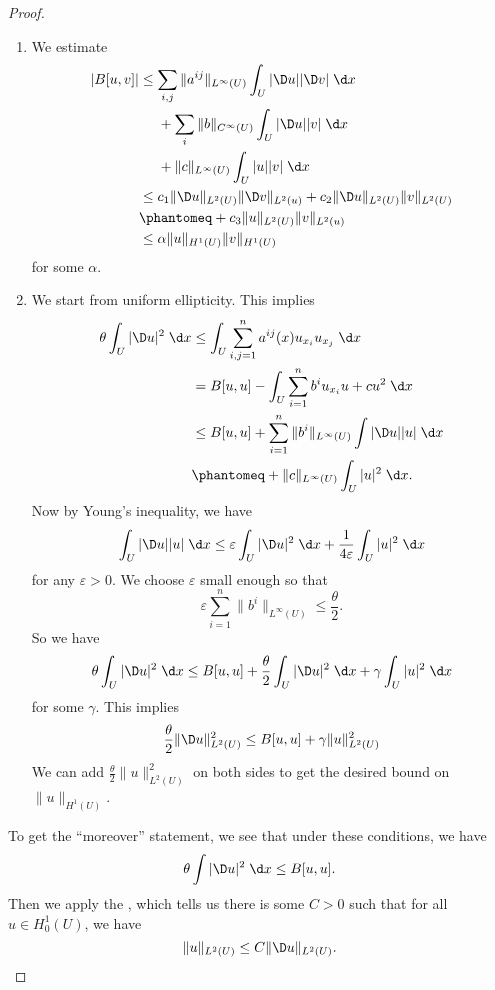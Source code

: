 \documentclass[a4paper]{article}
\begin{document}
\begin{proof}\leavevmode
  \begin{enumerate}
    \item We estimate
      \begin{align*}
        |B[u, v]| &\leq \sum_{i, j} \|a^{ij}\|_{L^\infty(U)} \int_U |\D u| |\D v|\;\d x\\
        &\hphantom{{ {}={}}}+ \sum_i \|b\|_{C^\infty(U)} \int_U |\D u| |v| \;\d x\\
        &\hphantom{{ {}={}}}+ \|c\|_{L^\infty(U)} \int_U |u| |v| \;\d x\\
        &\leq c_1 \|\D u\|_{L^2(U)} \|\D v\|_{L^2(u)} + c_2 \| \D u\|_{L^2(U)} \|v\|_{L^2(U)} \\
        &\phantomeq + c_3 \|u\|_{L^2(U)} \|v\|_{L^2(u)}\\
        &\leq \alpha \|u\|_{H^1(U)} \|v\|_{H^1(U)}
      \end{align*}
      for some $\alpha$.
    \item We start from uniform ellipticity. This implies
      \begin{align*}
        \theta \int_U |\D u|^2 \;\d x &\leq \int_U \sum_{i, j = 1}^n a^{ij}(x) u_{x_i} u_{x_j} \;\d x\\
        &= B[u ,u] - \int_U \sum_{i = 1}^n b^i u_{x_i} u + cu^2\;\d x\\
        &\leq B[u, u] + \sum_{i = 1}^n \|b^i\|_{L^\infty(U)} \int |\D u| |u| \;\d x \\
        &\phantomeq + \|c\|_{L^\infty(U)} \int_U |u|^2\;\d x.
      \end{align*}
      Now by Young's inequality, we have
      \[
        \int_U |\D u| |u| \;\d x \leq \varepsilon \int_U |\D u|^2 \;\d x + \frac{1}{4\varepsilon}\int_U |u|^2 \;\d x
      \]
      for any $\varepsilon > 0$. We choose $\varepsilon$ small enough so that
      \[
        \varepsilon\sum_{i = 1}^n \|b^i\|_{L^\infty(U)} \leq \frac{\theta}{2}.
      \]
      So we have
      \[
        \theta \int_U |\D u|^2 \;\d x \leq B[u, u] + \frac{\theta}{2} \int_U |\D u|^2 \;\d x + \gamma \int_U |u|^2\;\d x
      \]
      for some $\gamma$. This implies
      \[
        \frac{\theta}{2} \| \D u\|_{L^2(U)}^2 \leq B[u, u] + \gamma \|u\|_{L^2(U)}^2
      \]
      We can add $\frac{\theta}{2}\|u\|_{L^2(U)}^2$ on both sides to get the desired bound on $\|u\|_{H^1(U)}$.
  \end{enumerate}
  To get the ``moreover'' statement, we see that under these conditions, we have
  \[
    \theta \int |\D u|^2 \;\d x \leq B[u, u].
  \]
  Then we apply the , which tells us there is some $C > 0$ such that for all $u \in H_0^1 (U)$, we have
  \[
    \|u\|_{L^2(U)} \leq C \|\D u\|_{L^2(U)}.\qedhere
  \]
\end{proof}
\end{document}
